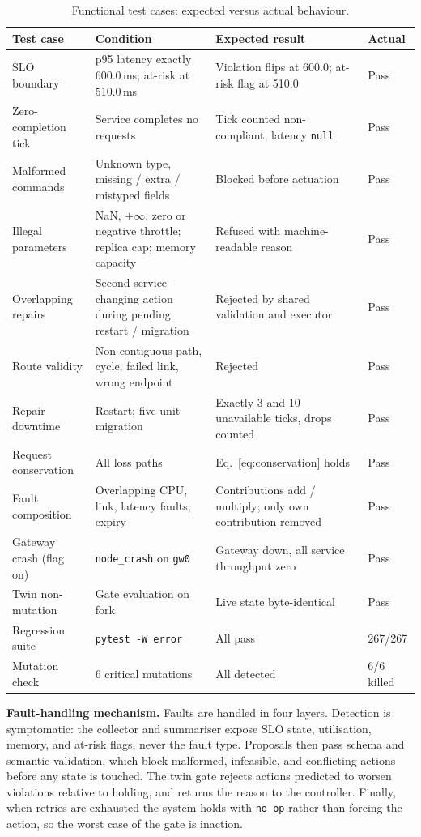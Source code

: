 \documentclass[conference]{IEEEtran}
\begin{document}
\begin{table}[t]
\centering
\caption{Functional test cases: expected versus actual behaviour.}
\label{tab:tests}
\small
\begin{tabularx}{\textwidth}{@{}p{3.3cm}YYp{1.4cm}@{}}
\toprule
Test case & Condition & Expected result & Actual \\
\midrule
SLO boundary & p95 latency exactly 600.0\,ms; at-risk at 510.0\,ms & Violation flips at 600.0; at-risk flag at 510.0 & Pass \\
Zero-completion tick & Service completes no requests & Tick counted non-compliant, latency \texttt{null} & Pass \\
Malformed commands & Unknown type, missing / extra / mistyped fields & Blocked before actuation & Pass \\
Illegal parameters & NaN, $\pm\infty$, zero or negative throttle; replica cap; memory capacity & Refused with machine-readable reason & Pass \\
Overlapping repairs & Second service-changing action during pending restart / migration & Rejected by shared validation and executor & Pass \\
Route validity & Non-contiguous path, cycle, failed link, wrong endpoint & Rejected & Pass \\
Repair downtime & Restart; five-unit migration & Exactly 3 and 10 unavailable ticks, drops counted & Pass \\
Request conservation & All loss paths & Eq.~\eqref{eq:conservation} holds & Pass \\
Fault composition & Overlapping CPU, link, latency faults; expiry & Contributions add / multiply; only own contribution removed & Pass \\
Gateway crash (flag on) & \texttt{node\_crash} on \texttt{gw0} & Gateway down, all service throughput zero & Pass \\
Twin non-mutation & Gate evaluation on fork & Live state byte-identical & Pass \\
Regression suite & \texttt{pytest -W error} & All pass & 267/267 \\
Mutation check & 6 critical mutations & All detected & 6/6 killed \\
\bottomrule
\end{tabularx}
\end{table}

\textbf{Fault-handling mechanism.} Faults are handled in four layers. Detection is symptomatic: the collector and summariser expose SLO state, utilisation, memory, and at-risk flags, never the fault type. Proposals then pass schema and semantic validation, which block malformed, infeasible, and conflicting actions before any state is touched. The twin gate rejects actions predicted to worsen violations relative to holding, and returns the reason to the controller. Finally, when retries are exhausted the system holds with \texttt{no\_op} rather than forcing the action, so the worst case of the gate is inaction.
\end{document}
